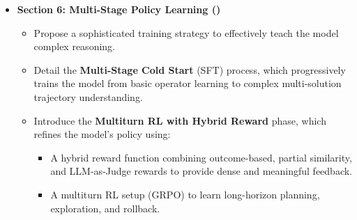 \begin{itemize}
    \item \textbf{Section 6: Multi-Stage Policy Learning (\policylearn)}
    \begin{itemize}
        \item Propose a sophisticated training strategy to effectively teach the model complex reasoning.
        \item Detail the \textbf{Multi-Stage Cold Start} (SFT) process, which progressively trains the model from basic operator learning to complex multi-solution trajectory understanding.
        \item Introduce the \textbf{Multiturn RL with Hybrid Reward} phase, which refines the model's policy using:
        \begin{itemize}
            \item A hybrid reward function combining outcome-based, partial similarity, and LLM-as-Judge rewards to provide dense and meaningful feedback.
            \item A multiturn RL setup (GRPO) to learn long-horizon planning, exploration, and rollback.
        \end{itemize}
    \end{itemize}
\end{itemize}
